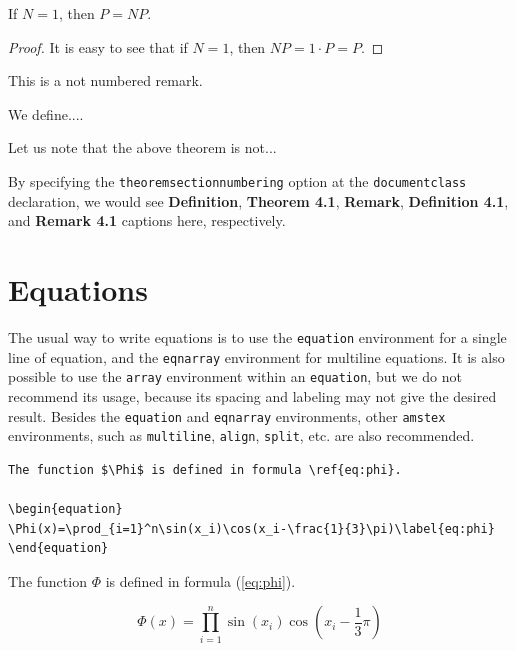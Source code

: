 \documentclass[withtitlethanks]{actacyb}
\begin{document}
\begin{theorem}
If $N=1$, then $P=NP$.
\end{theorem}

\begin{proof}
It is easy to see that if $N=1$, then $NP=1\cdot P = P$.
\end{proof}

\begin{remark*}
This is a not numbered remark.
\end{remark*}

\begin{definition}
We define....
\end{definition}

\begin{remark}
Let us note that the above theorem is not...
\end{remark}

By specifying the {\tt theoremsectionnumbering} option at the \verb|documentclass|
declaration, we would see \textbf{Definition}, \textbf{Theorem 4.1}, \textbf{Remark}, \textbf{Definition 4.1}, and \textbf{Remark 4.1} captions here, respectively.


\section{Equations}

The usual way to write equations is to use the \verb|equation| environment for a single line
of equation, and the \verb|eqnarray| environment for multiline equations.
It is also possible to use the \verb|array| environment within an \verb|equation|,
but we do not recommend its usage, because its spacing and labeling may not give the desired result.
Besides the \verb|equation| and \verb|eqnarray| environments,
other \verb|amstex| environments, such as \verb|multiline|, \verb|align|, \verb|split|, etc. 
are also recommended.

\begin{verbatim}
The function $\Phi$ is defined in formula \ref{eq:phi}.

\begin{equation}
\Phi(x)=\prod_{i=1}^n\sin(x_i)\cos(x_i-\frac{1}{3}\pi)\label{eq:phi}
\end{equation}
\end{verbatim}

The function $\Phi$ is defined in formula (\ref{eq:phi}).

\begin{equation}
\Phi(x)=\prod_{i=1}^n\sin(x_i)\cos(x_i-\frac{1}{3}\pi)\label{eq:phi}
\end{equation}
\end{document}
